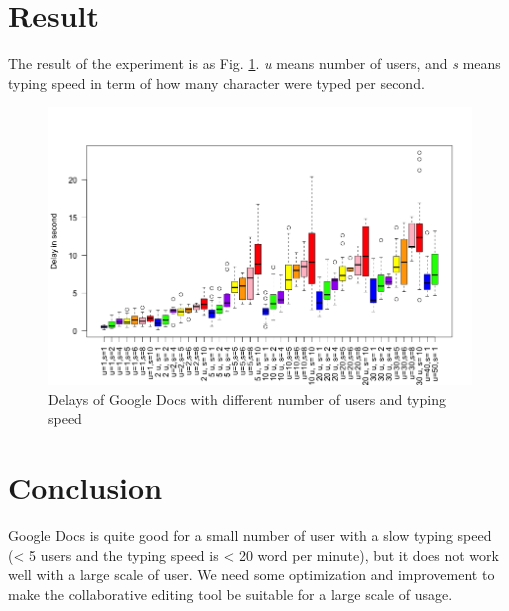 \documentclass[a4paper,12pt]{report}
\begin{document}
\section{Result}
The result of the experiment is as Fig. \ref{fig:fig1}. \textit{u} means number of users, and \textit{s} means typing speed in term of how many character were typed per second.

	\begin{figure}
		\includegraphics[width=\textwidth]{Rplot02}	
		\caption{Delays of Google Docs with different number of users and typing speed}
		\label{fig:fig1}
	\end{figure}

\section{Conclusion}
Google Docs is quite good for a small number of user with a slow typing speed (< 5 users and the typing speed is < 20 word per minute), but it does not work well with a large scale of user. We need some optimization and improvement to make the collaborative editing tool be suitable for a large scale of usage.
\end{document}
